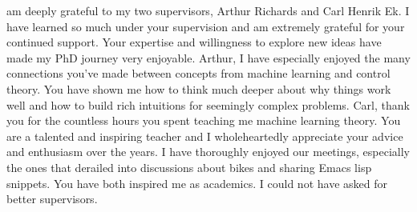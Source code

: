 \documentclass{mimosis-class/mimosis}
\numberwithin{equation}{chapter}
\begin{document}
\label{sec:org8deb6d9}
\begin{singlespace}
 am deeply grateful to my two supervisors, Arthur Richards and Carl Henrik Ek.
I have learned so much under your supervision and am extremely grateful for your continued support.
Your expertise and willingness to explore new ideas have made my PhD journey very enjoyable.
Arthur, I have especially enjoyed the many connections you've made between concepts from machine learning and control theory.
You have shown me how to think much deeper about why things work well and how
to build rich intuitions for seemingly complex problems.
Carl, thank you for the countless hours you spent teaching me machine learning theory.
You are a talented and inspiring teacher and I wholeheartedly appreciate your advice and enthusiasm over the years.
I have thoroughly enjoyed our meetings, especially the ones that derailed into discussions about bikes
and sharing Emacs lisp snippets.
You have both inspired me as academics.
I could not have asked for better supervisors.








\end{singlespace}
\end{document}

